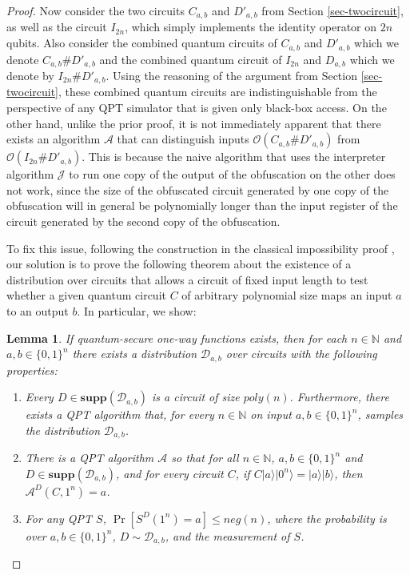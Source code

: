 \documentclass[11pt]{article}
\numberwithin{equation}{section}
\newtheorem{lemma}[theorem]{Lemma}
\newcommand{\algo}{\mathcal}
\newcommand\supp{\textbf{supp}}
\begin{document}
{\begin{proof}
Now consider the two circuits  $C_{a,b}$ and $D'_{a,b}$ from Section \ref{sec-twocircuit}, as well as the circuit $I_{2n}$, which simply implements the identity operator on $2n$ qubits.  Also consider the combined quantum circuits of $C_{a,b}$ and $D'_{a,b}$ which we denote $C_{a,b}\#D'_{a,b}$ and the combined quantum circuit of $I_{2n}$ and $D_{a,b}$ which we denote by $I_{2n}\#D'_{a,b}$.  Using the reasoning of the argument from Section \ref{sec-twocircuit}, these combined quantum circuits are indistinguishable from the perspective of any QPT simulator that is given only black-box access.  On the other hand, unlike the prior proof, it is not immediately apparent that there exists an algorithm $\algo{A}$ that can distinguish inputs $\algo{O}(C_{a,b}\#D'_{a,b})$ from $\algo{O}(I_{2n}\#D'_{a,b})$.  This is because the naive algorithm that uses the interpreter algorithm $\algo{J}$ to run one copy of the output of the obfuscation on the other does not work, since the size of the obfuscated circuit generated by one copy of the obfuscation will in general be polynomially longer than the input register of the circuit generated by the second copy of the obfuscation.  

To fix this issue, following the construction in the classical impossibility proof \cite{BGIRSVY12}, our solution is to prove the following theorem about the existence of a distribution over circuits that allows a circuit of fixed input length to test whether a given quantum circuit $C$ of arbitrary polynomial size maps an input $a$ to an output $b$. In particular, we show:
\begin{lemma}\label{lemma-circuitdistribution}
	If quantum-secure one-way functions exists, then for each $n\in\mathbb{N}$ and $a,b\in\{0,1\}^n$ there exists a distribution $\mathcal{D}_{a,b}$ over circuits with the following properties:
\begin{enumerate}
\item{Every $D\in \supp(\mathcal{D}_{a,b})$ is a circuit of size $poly(n)$.  Furthermore, there exists a QPT algorithm that,  for every $n\in\mathbb{N}$ on input $a,b\in\{0,1\}^n$, samples the distribution $\mathcal{D}_{a,b}$.}
\item{There is a QPT algorithm $\algo{A}$ so that for all $n \in \mathbb{N}$,   $a,b\in\{0,1\}^n$ and $D\in \supp(\mathcal{D}_{a,b})$, and for every circuit $C$, if $C|a\rangle|0^n\rangle=|a\rangle|b\rangle$, then $\algo{A}^D(C,1^n)=a$.}
\item{For any QPT $S$, $\Pr[S^D(1^n)=a]\leq neg(n)$, where the probability is over $a,b\in\{0,1\}^n$, $D\sim \mathcal{D}_{a,b}$, and the measurement of $S$.}	
\end{enumerate}
\end{lemma}


\end{proof}}
\end{document}
